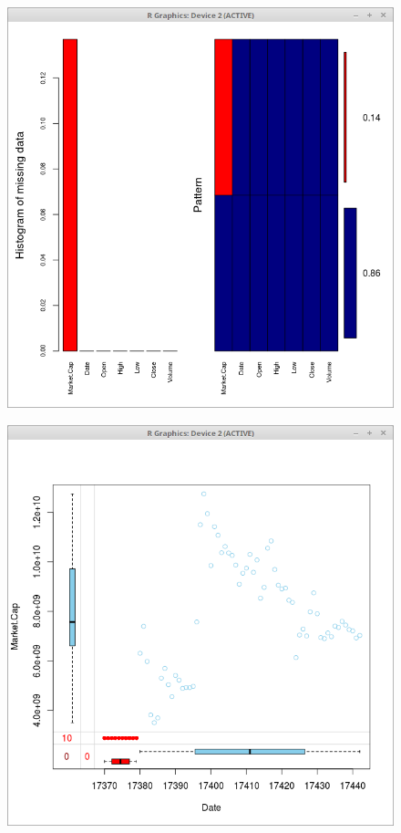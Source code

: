 \documentclass{article}
\begin{document}
\begin{figure}
\centering
\begin{minipage}{.5\textwidth}
  \centering
  \includegraphics[width=.8\linewidth]{btc_cash_price_missing}
  \label{fig:test1}
\end{minipage}%
\begin{minipage}{.5\textwidth}
  \centering
  \includegraphics[width=.8\linewidth]{btc_cash_price_missing_box_plot}
  \label{fig:test2}
\end{minipage}
\end{figure}
\end{document}

